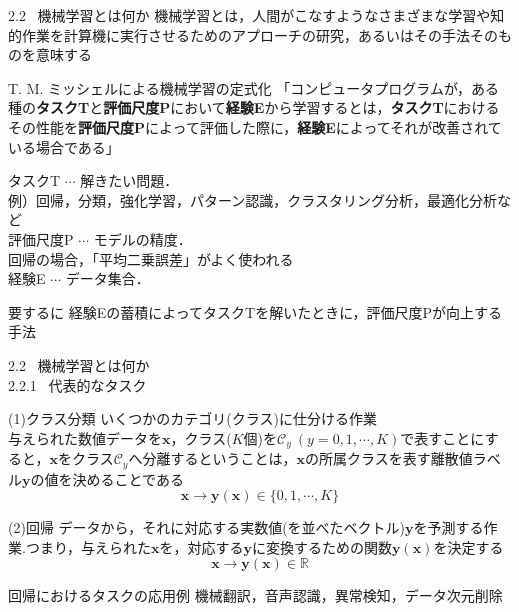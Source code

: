 \documentclass[dvipdfmx,10pt]{beamer}
\begin{document}
  \begin{frame}{2.2 \ 機械学習とは何か}
    機械学習とは，人間がこなすようなさまざまな学習や知的作業を計算機に実行させるためのアプローチの研究，あるいはその手法そのものを意味する
    \begin{block}{T. M. ミッシェルによる機械学習の定式化}
      「コンピュータプログラムが，ある種の\textbf{タスクT}と\textbf{評価尺度P}において\textbf{経験E}から学習するとは，\textbf{タスクT}におけるその性能を\textbf{評価尺度P}によって評価した際に，\textbf{経験E}によってそれが改善されている場合である」
    \end{block}
    タスクT $\cdots$ 解きたい問題．\\
    \hspace{1.7cm}例）回帰，分類，強化学習，パターン認識，クラスタリング分析，最適化分析など\\
    評価尺度P $\cdots$ モデルの精度．\\
    \hspace{2cm}回帰の場合，「平均二乗誤差」がよく使われる\\
    経験E $\cdots$ データ集合．\\
    \begin{itembox}[l]{要するに}
    経験Eの蓄積によってタスクTを解いたときに，評価尺度Pが向上する手法
    \end{itembox}
  \end{frame}

  \begin{frame}{2.2 \ 機械学習とは何か \\ \normalsize{2.2.1 \ 代表的なタスク}}
    \begin{block}{(1)クラス分類}
      いくつかのカテゴリ(クラス)に仕分ける作業\\
      与えられた数値データを$\bm{x}$，クラス($K$個)を$\mathcal{C}_y \ (y = 0,1,\cdots,K)$で表すことにすると，$\bm{x}$をクラス$\mathcal{C}_y$へ分離するということは，$\bm{x}$の所属クラスを表す離散値ラベル$\bm{y}$の値を決めることである
      \begin{equation*}
        \bm{x} \rightarrow \bm{y}(\bm{x}) \in \{0 , 1 , \cdots , K\}
      \end{equation*}
    \end{block}
    \begin{block}{(2)回帰}
      データから，それに対応する実数値(を並べたベクトル)$\bm{y}$を予測する作業.つまり，与えられた$\bm{x}$を，対応する$\bm{y}$に変換するための関数$\bm{y}(\bm{x})$を決定する
      \begin{equation*}
        \bm{x} \rightarrow \bm{y}(\bm{x}) \in \mathbb{R}
      \end{equation*} 
    \end{block}
       
    \begin{exampleblock}{回帰におけるタスクの応用例}
      機械翻訳，音声認識，異常検知，データ次元削除
    \end{exampleblock}
  \end{frame}
\end{document}
